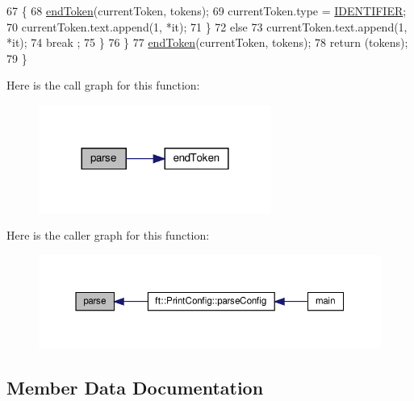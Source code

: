 \begin{DoxyCode}
67                     \{
68                         \hyperlink{classft_1_1_tokenizer_a4d9a98ce2e5ef728cfa5a68c8f726587}{endToken}(currentToken, tokens);
69                         currentToken.type = \hyperlink{namespaceft_aa520fbf142ba1e7e659590c07da31921a84f8ae2490f9e4bd2321fd21f4b0e807}{IDENTIFIER};
70                         currentToken.text.append(1, *it);
71                     \}
72                     \textcolor{keywordflow}{else} 
73                         currentToken.text.append(1, *it);
74                     break ;
75             \}
76         \}
77         \hyperlink{classft_1_1_tokenizer_a4d9a98ce2e5ef728cfa5a68c8f726587}{endToken}(currentToken, tokens);
78         \textcolor{keywordflow}{return} (tokens);
79     \}
\end{DoxyCode}
Here is the call graph for this function\+:
\nopagebreak
\begin{figure}[H]
\begin{center}
\leavevmode
\includegraphics[width=216pt]{classft_1_1_tokenizer_a10bacfc70f3d74a0e04218c1df86f6c2_cgraph}
\end{center}
\end{figure}
Here is the caller graph for this function\+:
\nopagebreak
\begin{figure}[H]
\begin{center}
\leavevmode
\includegraphics[width=350pt]{classft_1_1_tokenizer_a10bacfc70f3d74a0e04218c1df86f6c2_icgraph}
\end{center}
\end{figure}


\subsection{Member Data Documentation}
\mbox{\label{classft_1_1_tokenizer_a942c5b794d108f144c5b5028aaa34cb6}} 
